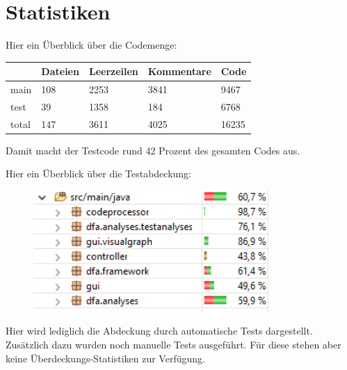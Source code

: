 \part{Statistiken}

Hier ein Überblick über die Codemenge:
\begin{center}
	\begin{tabular}{| l | l | l | l | l |}
		\hline
		& Dateien & Leerzeilen & Kommentare & Code \\ \hline
		main & 108 & 2253 & 3841 & 9467 \\ \hline
		test & 39 & 1358 & 184 & 6768 \\ \hline
		total & 147 & 3611 & 4025 & 16235 \\ \hline
	\end{tabular}
\end{center}

Damit macht der Testcode rund 42 Prozent des gesamten Codes aus.

Hier ein Überblick über die Testabdeckung:

\begin{figure}[H]
	\centering
	\includegraphics[width=0.8\textwidth]{Statistiken/coverage.png}
	\label{fig1}
\end{figure}


Hier wird lediglich die Abdeckung durch automatische Tests dargestellt. Zusätzlich dazu wurden noch manuelle Tests ausgeführt. Für diese stehen aber keine Überdeckungs-Statistiken zur Verfügung.